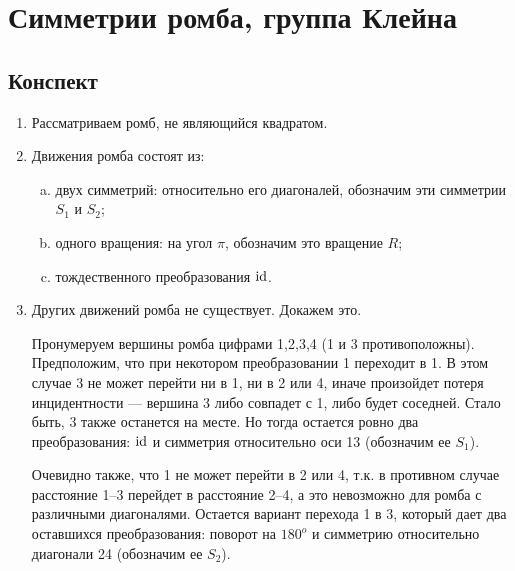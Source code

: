 \section{Симметрии ромба, группа Клейна}

\subsection*{Конспект}
\begin{enumerate}\setlength{\itemsep}{1pt}
\item Рассматриваем ромб, не являющийся квадратом.
\item Движения ромба состоят из:
\begin{enumerate}[a)]
\item двух симметрий: относительно его диагоналей, обозначим эти симметрии $S_1$ и $S_2$;
\item одного вращения: на угол $\pi$, обозначим это вращение $R$;
\item тождественного преобразования $\mathrm{id}$.
\end{enumerate}
\item Других движений ромба не существует. Докажем это.

Пронумеруем вершины ромба цифрами 1,2,3,4 (1 и 3 противоположны). Предположим, что при некотором преобразовании 1 переходит в 1. В этом случае 3 не может перейти ни в 1, ни в 2 или 4, иначе произойдет потеря инцидентности --- вершина 3 либо совпадет с 1, либо будет соседней. Стало быть, 3 также останется на месте. Но тогда остается ровно два преобразования: $\mathrm{id}$ и симметрия относительно оси 13 (обозначим ее $S_1$).

Очевидно также, что 1 не может перейти в 2 или 4, т.к. в противном случае расстояние 1--3 перейдет в расстояние 2--4, а это невозможно для ромба с различными диагоналями. Остается вариант перехода 1 в 3, который дает два оставшихся преобразования: поворот на $180^o$ и симметрию относительно диагонали 24 (обозначим ее $S_2$).


\end{enumerate}

